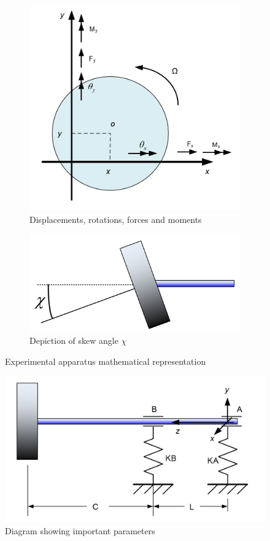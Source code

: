 		\begin{figure}[h]
			
			\begin{subfigure}[b]{.5\textwidth}
 				\centering
 				 \includegraphics[width=.75\linewidth]{./figures/Images/Figure_1a}
 				 \caption{Displacements, rotations, forces and moments}
 				 \label{fig:Figure_1a}
 				 \centering
			\end{subfigure}%
			\begin{subfigure}[b]{.5\textwidth}
  				\centering
  				\includegraphics[width=.75\linewidth]{./figures/Images/Figure_1b}
  				\caption{Depiction of skew angle $\chi$}
  				\label{fig:Figure_1b}
  				\centering
			\end{subfigure}
			\caption{Experimental apparatus mathematical representation}
			\label{fig:Figure_1}
			
		\end{figure}
		\begin{figure}[h]
			\centering
			\includegraphics[scale=.25]{./figures/Images/Figure_2}
			\caption{Diagram showing important parameters}
			\label{fig:Figure_2}
			\centering
		\end{figure}
